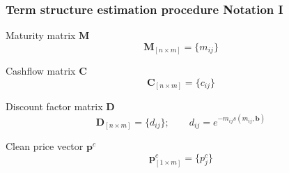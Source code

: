 \documentclass[mathserif,10pt]{beamer}
\begin{document}
\begin{frame}
	\frametitle{Term structure estimation procedure \newline Notation I}
	\begin{beamerboxesrounded}[shadow=true]{Maturity matrix $\bm{M}$}
		\begin{equation*}\label{maturitym}
		\bm{M}_{\left[n\times m\right]} = \{m_{ij}\}
		\end{equation*}
	\end{beamerboxesrounded}
	\vspace{0.3cm}
	\begin{beamerboxesrounded}[shadow=true]{Cashflow matrix $\bm{C}$}
		 \begin{equation*}\label{cashflowm}	
		\bm{C}_{\left[n\times m\right]} = \{c_{ij}\}
		\end{equation*}
	\end{beamerboxesrounded}
	\vspace{0.3cm}
	\begin{beamerboxesrounded}[shadow=true]{Discount factor matrix $\bm{D}$}
		\begin{equation*}\label{discountm}
		\bm{D}_{\left[n\times m\right]} = \{d_{ij}\}; \qquad d_{ij}=e^{-m_{ij}s(m_{ij},\bm{b})}
		\end{equation*}
	\end{beamerboxesrounded}
	\vspace{0.3cm}
	\begin{beamerboxesrounded}[shadow=true]{Clean price vector $\bm{p}^c$}
		 \begin{equation*}\label{pc}
		\bm{p}^c_{\left[1\times m\right]} = \{p^c_j\}
		\end{equation*}
	\end{beamerboxesrounded}	
\end{frame}
\end{document}
